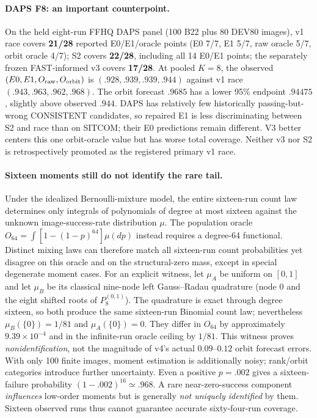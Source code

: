 \paragraph{DAPS F8: an important counterpoint.}
On the held eight-run FFHQ DAPS panel (100 B22 plus
80 DEV80 images), v1 race covers \textbf{21/28}
reported E0/E1/oracle points (E0 7/7, E1 5/7,
raw oracle 5/7, orbit oracle 4/7); S2 covers
\textbf{22/28}, including all 14 E0/E1 points;
the separately frozen FAST-informed v3 covers
\textbf{17/28}. At pooled $K=8$, the observed
$(E0,E1,O_{\rm raw},O_{\rm orbit})$ is
$(.928,.939,.939,.944)$ against v1 race
$(.943,.963,.962,.968)$. The orbit forecast
$.9685$ has a lower 95\% endpoint $.94475$,
slightly above observed $.944$. DAPS has relatively
few historically passing-but-wrong CONSISTENT candidates,
so repaired E1 is less discriminating between
S2 and race than on SITCOM; their E0 predictions
remain different. V3 better centers this one
orbit-oracle value but has worse total coverage.
Neither v3 nor S2 is retrospectively promoted as
the registered primary v1 race.

\paragraph{Sixteen moments still do not identify the rare tail.}
Under the idealized Bernoulli-mixture model, the entire
sixteen-run count law determines only integrals of
polynomials of degree at most sixteen against the
unknown image-success-rate distribution $\mu$.
The population oracle
$O_{64}=\int[1-(1-p)^{64}]\mu(dp)$ instead
requires a degree-64 functional. Distinct
mixing laws can therefore match all sixteen-run
count probabilities yet disagree on this oracle
and on the structural-zero mass, except in
special degenerate moment cases.
For an explicit witness, let $\mu_A$ be uniform on
$[0,1]$ and let $\mu_B$ be its classical nine-node
left Gauss--Radau quadrature (node 0 and the eight
shifted roots of $P_8^{(0,1)}$). The quadrature
is exact through degree sixteen, so both produce
the same sixteen-run Binomial count law; nevertheless
$\mu_B(\{0\})=1/81$ and $\mu_A(\{0\})=0$.
They differ in $O_{64}$ by approximately
$9.39\times10^{-4}$ and in the infinite-run
oracle ceiling by $1/81$. This witness proves
\emph{nonidentification}, not the magnitude of
v4's actual $0.09$--$0.12$ orbit forecast errors.
With only 100 finite images, moment estimation
is additionally noisy; rank/orbit categories
introduce further uncertainty. Even a positive
$p=.002$ gives a sixteen-failure probability
$(1-.002)^{16}\simeq.968$.
A rare near-zero-success component \emph{influences}
low-order moments but is generally \emph{not uniquely
identified} by them. Sixteen observed runs thus
cannot guarantee accurate sixty-four-run coverage.

